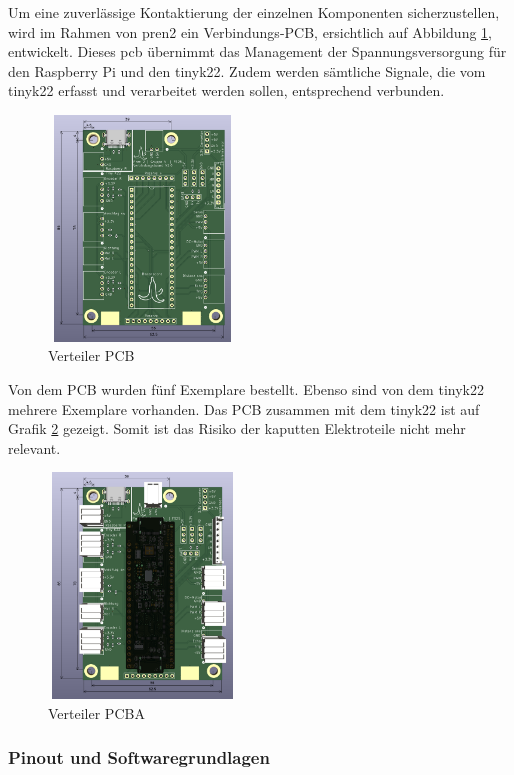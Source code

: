 Um eine zuverlässige Kontaktierung der einzelnen Komponenten sicherzustellen, wird im Rahmen von \acrshort{pren2} ein Verbindungs-PCB, ersichtlich auf Abbildung \ref{fig: Verteiler PCB}, entwickelt. Dieses \acrshort{pcb} übernimmt das Management der
Spannungsversorgung für den Raspberry Pi und den \gls{tinyk22}. Zudem werden sämtliche Signale,
die vom \gls{tinyk22} erfasst und verarbeitet werden sollen, entsprechend verbunden.

\begin{figure}[H]
\centering
\includegraphics[width=5cm, height=6cm]{assets/ET/PCB/VerteilerPCB_unbestueckt.png}
\caption{Verteiler PCB}
\label{fig: Verteiler PCB}
\end{figure}

Von dem PCB wurden fünf Exemplare bestellt. Ebenso sind von dem \gls{tinyk22} mehrere Exemplare vorhanden. Das PCB zusammen mit dem \gls{tinyk22} ist auf Grafik \ref{fig: Verteiler PCBA} gezeigt. Somit ist das Risiko der kaputten Elektroteile nicht mehr relevant.

\begin{figure}[H]
\centering
\includegraphics[width=5cm, height=6cm]{assets/ET/PCB/VerteilerPCB_bestueckt.png}
\caption{Verteiler PCBA}
\label{fig: Verteiler PCBA}
\end{figure}


\subsubsection{Pinout und Softwaregrundlagen}

